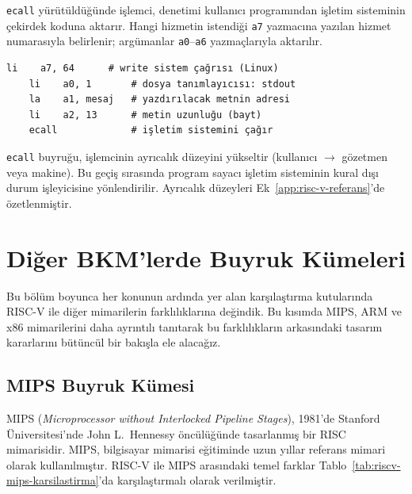 \texttt{ecall} yürütüldüğünde işlemci, denetimi kullanıcı programından işletim sisteminin çekirdek koduna aktarır. Hangi hizmetin istendiği \texttt{a7} yazmacına yazılan hizmet numarasıyla belirlenir; argümanlar \texttt{a0}--\texttt{a6} yazmaçlarıyla aktarılır.

\begin{lstlisting}[style=riscv]
    li    a7, 64      # write sistem çağrısı (Linux)
    li    a0, 1       # dosya tanımlayıcısı: stdout
    la    a1, mesaj   # yazdırılacak metnin adresi
    li    a2, 13      # metin uzunluğu (bayt)
    ecall             # işletim sistemini çağır
\end{lstlisting}

\begin{bilginot}
\texttt{ecall} buyruğu, işlemcinin ayrıcalık düzeyini yükseltir (kullanıcı $\to$ gözetmen veya makine). Bu geçiş sırasında program sayacı işletim sisteminin kural dışı durum işleyicisine yönlendirilir. Ayrıcalık düzeyleri Ek~\ref{app:risc-v-referans}'de özetlenmiştir.
\end{bilginot}

\section{Diğer BKM'lerde Buyruk Kümeleri}
\label{sec:diger-isa}

Bu bölüm boyunca her konunun ardında yer alan karşılaştırma kutularında RISC-V ile diğer mimarilerin farklılıklarına değindik. Bu kısımda MIPS, ARM ve x86 mimarilerini daha ayrıntılı tanıtarak bu farklılıkların arkasındaki tasarım kararlarını bütüncül bir bakışla ele alacağız.


\subsection{MIPS Buyruk Kümesi}

MIPS (\textit{Microprocessor without Interlocked Pipeline Stages}), 1981'de Stanford Üniversitesi'nde John L.\ Hennessy öncülüğünde tasarlanmış bir RISC mimarisidir. MIPS, bilgisayar mimarisi eğitiminde uzun yıllar referans mimari olarak kullanılmıştır. RISC-V ile MIPS arasındaki temel farklar Tablo~\ref{tab:riscv-mips-karsilastirma}'da karşılaştırmalı olarak verilmiştir.


